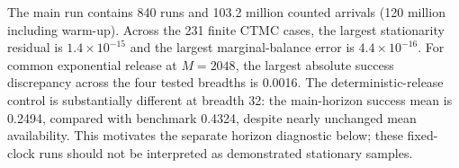 The main run contains 840 runs and 103.2 million counted arrivals (120 million including warm-up). Across the 231 finite CTMC cases, the largest stationarity residual is $1.4\times10^{-15}$ and the largest marginal-balance error is $4.4\times10^{-16}$. For common exponential release at $M=2048$, the largest absolute success discrepancy across the four tested breadths is 0.0016. The deterministic-release control is substantially different at breadth 32: the main-horizon success mean is 0.2494, compared with benchmark 0.4324, despite nearly unchanged mean availability. This motivates the separate horizon diagnostic below; these fixed-clock runs should not be interpreted as demonstrated stationary samples.
